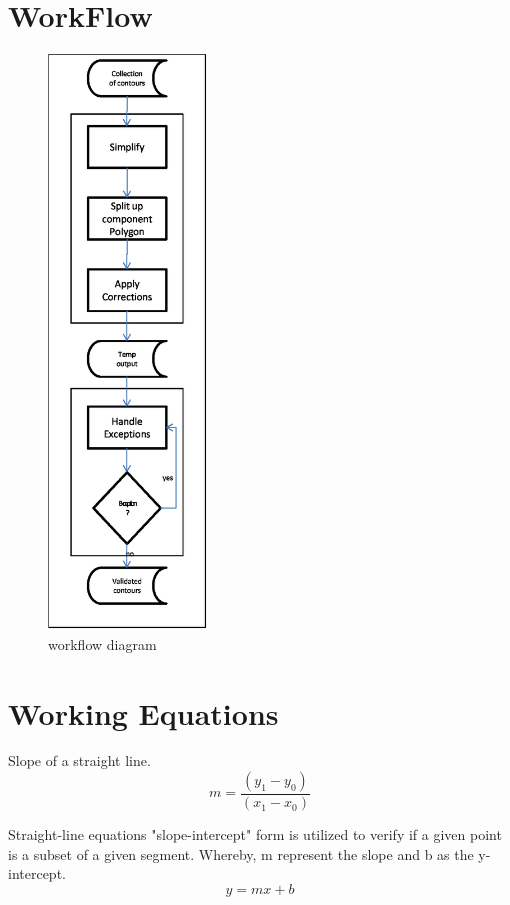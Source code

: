 \documentclass{sig-alternate}
\begin{document}
\section{WorkFlow}
\begin{figure}
 \centering
 \includegraphics[height=6in]{workflow.eps}
 \caption{workflow diagram}

 \label{fig:workflow diagram}
\end{figure}


\section{Working Equations}

Slope of a straight line.
\begin{equation}
    m = \frac{(y_1 - y_0)}{(x_1 - x_0)}
\end{equation}

Straight-line equations "slope-intercept" form is utilized to verify if a given point is a subset of a given segment. Whereby, m represent the slope and b as the y-intercept.
\begin{equation}
    y = mx + b
\end{equation}
\end{document}
